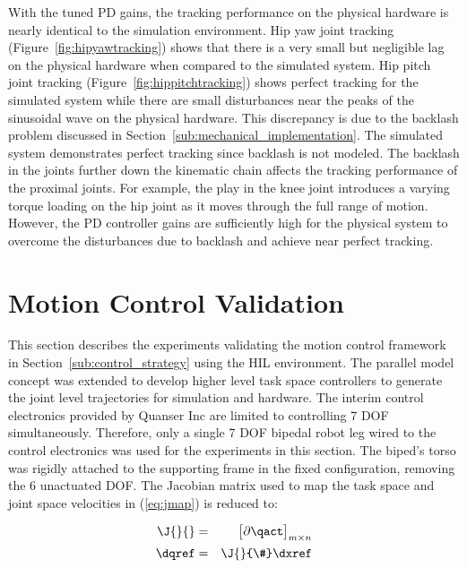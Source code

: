 
With the tuned PD gains, the tracking performance on the physical hardware is nearly identical to the simulation environment. Hip yaw joint tracking (Figure~\ref{fig:hipyawtracking}) shows that there is a very small but negligible lag on the physical hardware when compared to the simulated system. Hip pitch joint tracking (Figure~\ref{fig:hippitchtracking}) shows perfect tracking for the simulated system while there are small disturbances near the peaks of the sinusoidal wave on the physical hardware. This discrepancy is due to the backlash problem discussed in Section~\ref{sub:mechanical_implementation}. The simulated system demonstrates perfect tracking since backlash is not modeled. The backlash in the joints further down the kinematic chain affects the tracking performance of the proximal joints. For example, the play in the knee joint introduces a varying torque loading on the hip joint as it moves through the full range of motion. However, the PD controller gains are sufficiently high for the physical system to overcome the disturbances due to backlash and achieve near perfect tracking. 



\section{Motion Control Validation} %
\label{sec:motion_control_validation}
This section describes the experiments validating the motion control framework in Section~\ref{sub:control_strategy} using the HIL environment. The parallel model concept was extended to develop higher level task space controllers to generate the joint level trajectories for simulation and hardware. The interim control electronics provided by Quanser Inc are limited to controlling 7 DOF simultaneously. Therefore, only a single 7 DOF bipedal robot leg wired to the control electronics was used for the experiments in this section. The biped's torso was rigidly attached to the supporting frame in the fixed configuration, removing the 6 unactuated DOF. The Jacobian matrix used to map the task space and joint space velocities in (\ref{eq:jmap}) is reduced to: 

\begin{eqnarray}
	\J{}{} &=& \begin{bmatrix} \partial \qact \\ \end{bmatrix}_{m \times n} \\
	\dqref &=& \J{}{\#} \dxref \label{eq:calcqref}
\end{eqnarray}

